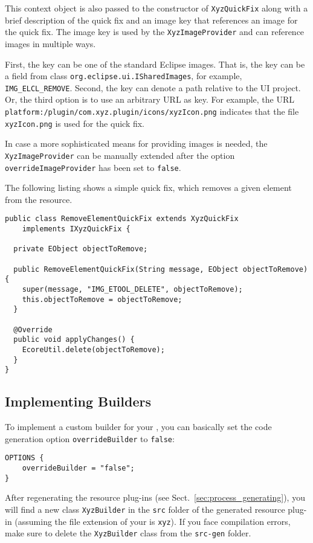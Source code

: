This context object is also passed to the constructor of \texttt{XyzQuickFix} along
with a brief description of the quick fix and an image key that references an image 
for the quick fix. The image key is used by the \texttt{XyzImageProvider} and
can reference images in multiple ways.

First, the key can be one of the standard Eclipse images. That is, the key can
be a field from class \texttt{org.eclipse.ui.ISharedImages}, for example,
\texttt{IMG\_ELCL\_REMOVE}. Second, the key can denote a path 
relative to the UI project. Or, the third option is to use an arbitrary 
URL as key. For example, the URL
\texttt{platform:/plugin/com.xyz.plugin/icons/xyzIcon.png} indicates that the
file \texttt{xyzIcon.png} is used for the quick fix.

In case a more sophisticated means for providing images is needed, the
\texttt{XyzImageProvider} can be manually extended after the option 
\texttt{overrideImageProvider} has been set to \texttt{false}.

The following listing shows a simple quick fix, which removes a given element from
the resource.

\lstset{language=Java}
\begin{lstlisting}
public class RemoveElementQuickFix extends XyzQuickFix
    implements IXyzQuickFix {

  private EObject objectToRemove;

  public RemoveElementQuickFix(String message, EObject objectToRemove) {
    super(message, "IMG_ETOOL_DELETE", objectToRemove);
    this.objectToRemove = objectToRemove;
  }

  @Override
  public void applyChanges() {
    EcoreUtil.delete(objectToRemove);
  }
}
\end{lstlisting}


\subsection{Implementing Builders}
\label{sec:cust_builders}

To implement a custom builder for your \DSL, you can basically set the code
generation option \texttt{overrideBuilder} to \texttt{false}:

\lstset{language=CS}
\begin{lstlisting}
OPTIONS {
    overrideBuilder = "false";
}
\end{lstlisting}

After regenerating the resource plug-ins (see
Sect.~\ref{sec:process_generating}), you will find a new class
\texttt{XyzBuilder} in the \texttt{src} folder of the generated resource 
plug-in (assuming the file extension of your \DSL is \texttt{xyz}). If you
face compilation errors, make sure to delete the \texttt{XyzBuilder} 
class from the \texttt{src-gen} folder.

